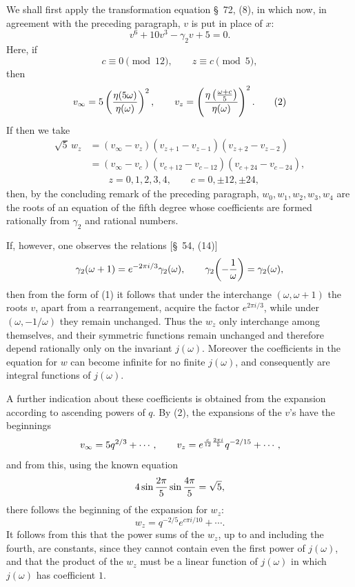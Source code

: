\documentclass[11pt]{article}
\begin{document}
We shall first apply the transformation equation \S~72, (8), in which now, in agreement with the preceding paragraph, \(v\) is put in place of \(x\):
\begin{equation}
 v^6+10v^3-\gamma_2 v+5=0.
\tag{1}
\end{equation}
Here, if
\[
 c\equiv0\pmod {12},\qquad z\equiv c\pmod5,
\]
then
\begin{equation}
 v_\infty=5\left({\eta(5\omega)\over\eta(\omega)}\right)^2,\qquad
 v_z=\left({\eta\left({\omega+c\over5}\right)\over\eta(\omega)}\right)^2.
\tag{2}
\end{equation}
If then we take
\begin{equation}
\begin{aligned}
 \sqrt5\,w_z
 &= (v_\infty-v_z)(v_{z+1}-v_{z-1})(v_{z+2}-v_{z-2})\\
 &= (v_\infty-v_c)(v_{c+12}-v_{c-12})(v_{c+24}-v_{c-24}),\\
&\hspace{2em} z=0,1,2,3,4,\qquad c=0,\pm12,\pm24,
\end{aligned}
\tag{3}
\end{equation}
then, by the concluding remark of the preceding paragraph, \(w_0,w_1,w_2,w_3,w_4\) are the roots of an equation of the fifth degree whose coefficients are formed rationally from \(\gamma_2\) and rational numbers.

If, however, one observes the relations [\S~54, (14)]
\[
 \gamma_2(\omega+1)=e^{-2\pi i/3}\gamma_2(\omega),
 \qquad
 \gamma_2\!\left(-{1\over\omega}\right)=\gamma_2(\omega),
\]
then from the form of (1) it follows that under the interchange \((\omega,\omega+1)\) the roots \(v\), apart from a rearrangement, acquire the factor \(e^{2\pi i/3}\), while under \((\omega,-1/\omega)\) they remain unchanged. Thus the \(w_z\) only interchange among themselves, and their symmetric functions remain unchanged and therefore depend rationally only on the invariant \(j(\omega)\). Moreover the coefficients in the equation for \(w\) can become infinite for no finite \(j(\omega)\), and consequently are integral functions of \(j(\omega)\).

A further indication about these coefficients is obtained from the expansion according to ascending powers of \(q\). By (2), the expansions of the \(v\)'s have the beginnings
\[
 v_\infty=5q^{2/3}+\cdots,\qquad
 v_z=e^{\frac{c}{12}{2\pi i\over5}}q^{-2/15}+\cdots,
\]
and from this, using the known equation
\[
 4\sin {2\pi\over5}\sin {4\pi\over5}=\sqrt5,
\]
there follows the beginning of the expansion for \(w_z\):
\begin{equation}
 w_z=q^{-2/5}e^{c\pi i/10}+\cdots.
\tag{4}
\end{equation}
It follows from this that the power sums of the \(w_z\), up to and including the fourth, are constants, since they cannot contain even the first power of \(j(\omega)\), and that the product of the \(w_z\) must be a linear function of \(j(\omega)\) in which \(j(\omega)\) has coefficient \(1\).
\end{document}
